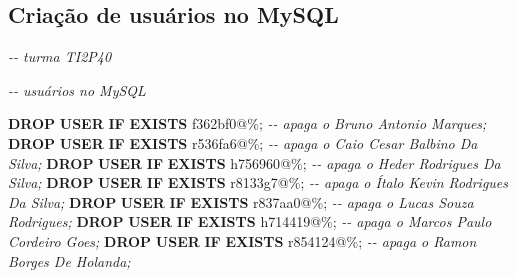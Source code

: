 \documentclass[
]{book}
\newenvironment{Shaded}{\begin{snugshade}}{\end{snugshade}}
\newcommand{\CommentTok}[1]{\textcolor[rgb]{0.56,0.35,0.01}{\textit{#1}}}
\newcommand{\ControlFlowTok}[1]{\textcolor[rgb]{0.13,0.29,0.53}{\textbf{#1}}}
\newcommand{\FunctionTok}[1]{\textcolor[rgb]{0.13,0.29,0.53}{\textbf{#1}}}
\newcommand{\KeywordTok}[1]{\textcolor[rgb]{0.13,0.29,0.53}{\textbf{#1}}}
\newcommand{\NormalTok}[1]{#1}
\newcommand{\StringTok}[1]{\textcolor[rgb]{0.31,0.60,0.02}{#1}}
\begin{document}


\subsection{Criação de usuários no MySQL}\label{criauxe7uxe3o-de-usuuxe1rios-no-mysql}

\begin{Shaded}
\begin{Highlighting}[]

\CommentTok{{-}{-} turma TI2P40}

\CommentTok{{-}{-} usuários no MySQL}

\KeywordTok{DROP} \FunctionTok{USER} \ControlFlowTok{IF} \KeywordTok{EXISTS} \StringTok{\textquotesingle{}f362bf0\textquotesingle{}}\NormalTok{@}\StringTok{\textquotesingle{}\%\textquotesingle{}}\NormalTok{; }\CommentTok{{-}{-} apaga o \textquotesingle{}Bruno Antonio Marques\textquotesingle{};}
\KeywordTok{DROP} \FunctionTok{USER} \ControlFlowTok{IF} \KeywordTok{EXISTS} \StringTok{\textquotesingle{}r536fa6\textquotesingle{}}\NormalTok{@}\StringTok{\textquotesingle{}\%\textquotesingle{}}\NormalTok{; }\CommentTok{{-}{-} apaga o \textquotesingle{}Caio Cesar Balbino Da Silva\textquotesingle{};}
\KeywordTok{DROP} \FunctionTok{USER} \ControlFlowTok{IF} \KeywordTok{EXISTS} \StringTok{\textquotesingle{}h756960\textquotesingle{}}\NormalTok{@}\StringTok{\textquotesingle{}\%\textquotesingle{}}\NormalTok{; }\CommentTok{{-}{-} apaga o \textquotesingle{}Heder Rodrigues Da Silva\textquotesingle{};}
\KeywordTok{DROP} \FunctionTok{USER} \ControlFlowTok{IF} \KeywordTok{EXISTS} \StringTok{\textquotesingle{}r8133g7\textquotesingle{}}\NormalTok{@}\StringTok{\textquotesingle{}\%\textquotesingle{}}\NormalTok{; }\CommentTok{{-}{-} apaga o \textquotesingle{}Ítalo Kevin Rodrigues Da Silva\textquotesingle{};}
\KeywordTok{DROP} \FunctionTok{USER} \ControlFlowTok{IF} \KeywordTok{EXISTS} \StringTok{\textquotesingle{}r837aa0\textquotesingle{}}\NormalTok{@}\StringTok{\textquotesingle{}\%\textquotesingle{}}\NormalTok{; }\CommentTok{{-}{-} apaga o \textquotesingle{}Lucas Souza Rodrigues\textquotesingle{};}
\KeywordTok{DROP} \FunctionTok{USER} \ControlFlowTok{IF} \KeywordTok{EXISTS} \StringTok{\textquotesingle{}h714419\textquotesingle{}}\NormalTok{@}\StringTok{\textquotesingle{}\%\textquotesingle{}}\NormalTok{; }\CommentTok{{-}{-} apaga o \textquotesingle{}Marcos Paulo Cordeiro Goes\textquotesingle{};}
\KeywordTok{DROP} \FunctionTok{USER} \ControlFlowTok{IF} \KeywordTok{EXISTS} \StringTok{\textquotesingle{}r854124\textquotesingle{}}\NormalTok{@}\StringTok{\textquotesingle{}\%\textquotesingle{}}\NormalTok{; }\CommentTok{{-}{-} apaga o \textquotesingle{}Ramon Borges De Holanda\textquotesingle{};}



\end{Highlighting}
\end{Shaded}
\end{document}
